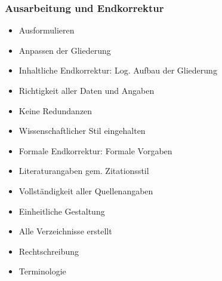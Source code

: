 \subsubsection{Ausarbeitung und Endkorrektur}\label{ausarbeitung-und-endkorrektur}

\begin{itemize}%
\item Ausformulieren  
\item Anpassen der Gliederung  
\item Inhaltliche Endkorrektur: Log. Aufbau der Gliederung 
\item Richtigkeit aller Daten und Angaben 
\item Keine Redundanzen 
\item Wissenschaftlicher Stil eingehalten 
\item Formale Endkorrektur: Formale Vorgaben 
\item Literaturangaben gem. Zitationsstil 
\item Vollständigkeit aller Quellenangaben 
\item Einheitliche Gestaltung 
\item Alle Verzeichnisse erstellt 
\item Rechtschreibung 
\item Terminologie 
\end{itemize}
